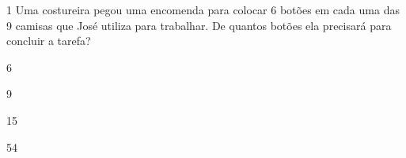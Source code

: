 \num{1} Uma costureira pegou uma encomenda para colocar 6 botões em
cada uma das 9 camisas que José utiliza para trabalhar. De quantos botões
ela precisará para concluir a tarefa?

\begin{escolha}
    \item 6
    \item 9
    \item 15
    \item 54
\end{escolha}


